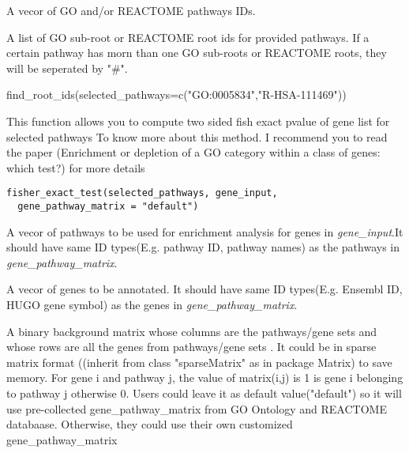 \documentclass[a4paper]{book}
\begin{document}
%
\begin{Arguments}
\begin{ldescription}
\item[\code{selected\_pathways}] A vecor of GO and/or REACTOME pathways IDs.
\end{ldescription}
\end{Arguments}
%
\begin{Value}
A list of GO sub-root or REACTOME root ids for provided pathways.
If a certain pathway has morn than one GO sub-roots or REACTOME roots, they will be seperated by "\#".
\end{Value}
%
\begin{Examples}
\begin{ExampleCode}
find_root_ids(selected_pathways=c("GO:0005834","R-HSA-111469"))
\end{ExampleCode}
\end{Examples}
%
\begin{Description}\relax
This function allows you to compute two sided fish exact pvalue of gene list for selected  pathways
To know more about this method. I recommend you to read the paper (Enrichment or depletion of a GO category within a class of genes: which test?) for more details
\end{Description}
%
\begin{Usage}
\begin{verbatim}
fisher_exact_test(selected_pathways, gene_input,
  gene_pathway_matrix = "default")
\end{verbatim}
\end{Usage}
%
\begin{Arguments}
\begin{ldescription}
\item[\code{selected\_pathways}] A vecor of pathways to be used for enrichment analysis for genes in \emph{gene\_input}.It should have same ID types(E.g. pathway ID, pathway names) as the pathways in \emph{gene\_pathway\_matrix}.

\item[\code{gene\_input}] A vecor of genes to be annotated. It should have same ID types(E.g. Ensembl ID, HUGO gene symbol) as the genes in \emph{gene\_pathway\_matrix}.

\item[\code{gene\_pathway\_matrix}] A binary background matrix whose columns are the pathways/gene sets and
whose rows are all the genes from pathways/gene sets . It could be in sparse matrix format ((inherit from class "sparseMatrix" as in package Matrix) to save memory.
For gene i and pathway j, the value of matrix(i,j) is 1 is gene i belonging to pathway j otherwise 0.
Users could leave it as default value("default") so it will use pre-collected gene\_pathway\_matrix from GO Ontology and REACTOME databaase.
Otherwise, they could use their own customized gene\_pathway\_matrix
\end{ldescription}
\end{Arguments}
\end{document}
